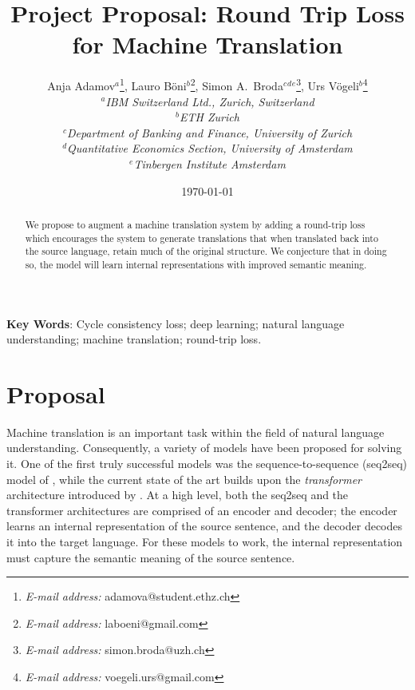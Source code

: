 \documentclass[11pt,a4paper]{article}
\begin{document}
\title{Project Proposal: Round Trip Loss for Machine Translation}
\date{\today}
\author{
Anja Adamov$\mbox{}^a$\thanks{\emph{E-mail address:} adamova@student.ethz.ch},
Lauro B\"{o}ni$\mbox{}^b$\thanks{\emph{E-mail address:} laboeni@gmail.com},
Simon A.\ Broda$\mbox{}^c\mbox{}^d\mbox{}^e$\thanks{\emph{E-mail address:} simon.broda@uzh.ch},
Urs V\"{o}geli$\mbox{}^b$\thanks{\emph{E-mail address:} voegeli.urs@gmail.com}
\medskip \\
\textit{\small $\mbox{}^a$IBM Switzerland Ltd., Zurich, Switzerland}
\medskip \\
\textit{\small $\mbox{}^b$ETH Zurich}
\medskip \\
\textit{\small $\mbox{}^c$Department of Banking and Finance, University of Zurich}
\medskip \\
\textit{\small $\mbox{}^d$Quantitative Economics Section, University of Amsterdam}
\medskip \\
\textit{\small $\mbox{}^e$Tinbergen Institute Amsterdam}
}
\maketitle \setcounter{page}{0}\thispagestyle{empty}
\begin{abstract}
We propose to augment a machine translation system by adding a round-trip loss which encourages the system to generate translations that when translated back into the source language, retain much of the original structure. We conjecture that in doing so, the model will learn internal representations with improved semantic meaning.
\end{abstract}
\bigskip \textbf{Key Words}: Cycle consistency loss; deep learning; natural language understanding; machine translation; round-trip loss.
\newpage
\setcounter{page}{1}
\section*{Proposal}
Machine translation is an important task within the field of natural language understanding. Consequently, a variety of models have been proposed for solving it. One of the first truly successful models was the sequence-to-sequence (seq2seq) model of \citet{seq2seq}, while the current state of the art builds upon the \emph{transformer} architecture introduced by \citet{transformer}. At a high level, both the seq2seq and the transformer architectures are comprised of an encoder and decoder; the encoder learns an internal representation of the source sentence, and the decoder decodes it into the target language. For these models to work, the internal representation must capture the semantic meaning of the source sentence.
\end{document}
